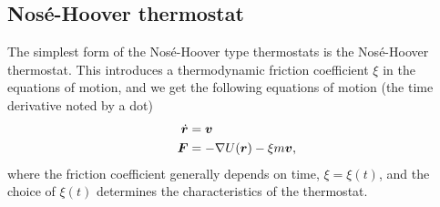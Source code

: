 
\subsection{Nosé-Hoover thermostat}
The simplest form of the Nosé-Hoover type thermostats is the Nosé-Hoover thermostat. This introduces a thermodynamic friction coefficient $\xi$ in the equations of motion, and we get the following equations of motion (the time derivative noted by a dot)
\begin{align}
    \dot {\boldsymbol{r}} &= \boldsymbol{v} \label{eq:nose_hoover_velocity}\\
    \boldsymbol{F} &= -\nabla U(\boldsymbol{r}) - \xi m \boldsymbol{v}, \label{eq:nose_hoover_force}
\end{align}
where the friction coefficient generally depends on time, $\xi = \xi(t)$, and the choice of $\xi(t)$ determines the characteristics of the thermostat. 

